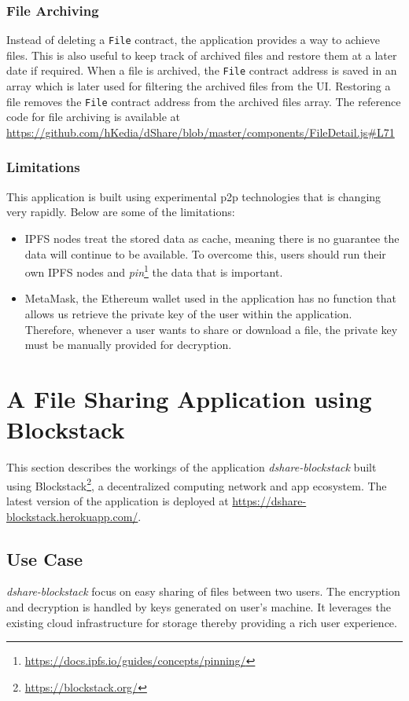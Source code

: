			\subsubsection{File Archiving}
				Instead of deleting a \texttt{File} contract, the application provides a way to achieve files. This is also useful to keep track of archived files and restore them at a later date if required. When a file is archived, the \texttt{File} contract address is saved in an array which is later used for filtering the archived files from the UI. Restoring a file removes the \texttt{File} contract address from the archived files array. The reference code for file archiving is available at \url{https://github.com/hKedia/dShare/blob/master/components/FileDetail.js#L71}
				
			\subsubsection{Limitations}
			This application is built using experimental p2p technologies that is changing very rapidly. Below are some of the limitations:
			
			\begin{itemize}
				\item IPFS nodes treat the stored data as cache, meaning there is no guarantee the data will continue to be available. To overcome this, users should run their own IPFS nodes and \textit{pin}\footnote{\url{https://docs.ipfs.io/guides/concepts/pinning/}} the data that is important.
				\item MetaMask, the Ethereum wallet used in the application has no function that allows us retrieve the private key of the user within the application. Therefore, whenever a user wants to share or download a file, the private key must be manually provided for decryption.
			\end{itemize}
			
	\section{A File Sharing Application using Blockstack}
		This section describes the workings of the application \textit{dshare-blockstack}\cite{harsh_kedia_2019_3359854} built using Blockstack\footnote{\url{https://blockstack.org/}}, a decentralized computing network and app ecosystem. The latest version of the application is deployed at \url{https://dshare-blockstack.herokuapp.com/}.
		
		\subsection{Use Case}
		\textit{dshare-blockstack} focus on easy sharing of files between two users. The encryption and decryption is handled by keys generated on user's machine. It leverages the existing cloud infrastructure for storage thereby providing a rich user experience.
		
